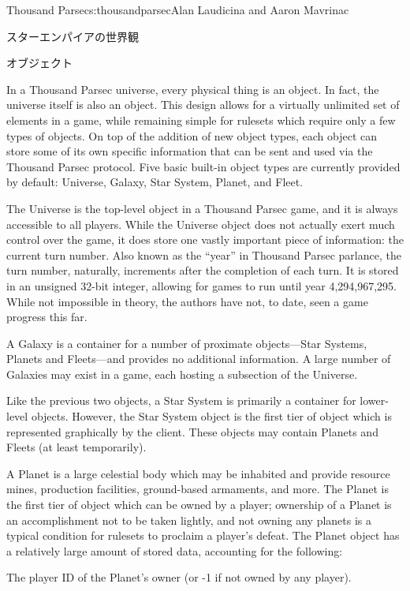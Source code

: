 \begin{aosachapter}{Thousand Parsec}{s:thousandparsec}{Alan Laudicina and Aaron Mavrinac}
\begin{aosasect1}{スターエンパイアの世界観}
\begin{aosasect2}{オブジェクト}

In a Thousand Parsec universe, every physical thing is an object. In
fact, the universe itself is also an object. This design allows for a
virtually unlimited set of elements in a game, while remaining simple
for rulesets which require only a few types of objects. On top of the
addition of new object types, each object can store some of its own
specific information that can be sent and used via the Thousand Parsec
protocol. Five basic built-in object types are currently provided by
default: Universe, Galaxy, Star System, Planet, and Fleet.

The Universe is the top-level object in a Thousand Parsec game, and it
is always accessible to all players. While the Universe object does
not actually exert much control over the game, it does store one
vastly important piece of information: the current turn number. Also
known as the ``year'' in Thousand Parsec parlance, the turn number,
naturally, increments after the completion of each turn. It is stored
in an unsigned 32-bit integer, allowing for games to run until year
4,294,967,295. While not impossible in theory, the authors have not,
to date, seen a game progress this far.

A Galaxy is a container for a number of proximate objects---Star
Systems, Planets and Fleets---and provides no additional
information. A large number of Galaxies may exist in a game, each
hosting a subsection of the Universe.

Like the previous two objects, a Star System is primarily a container
for lower-level objects. However, the Star System object is the first
tier of object which is represented graphically by the client. These
objects may contain Planets and Fleets (at least temporarily).

A Planet is a large celestial body which may be inhabited and provide
resource mines, production facilities, ground-based armaments, and
more. The Planet is the first tier of object which can be owned by a
player; ownership of a Planet is an accomplishment not to be taken
lightly, and not owning any planets is a typical condition for
rulesets to proclaim a player's defeat. The Planet object has a
relatively large amount of stored data, accounting for the following:

\begin{aosaitemize}

  \item The player ID of the Planet's owner (or -1 if not owned by any
  player).


\end{aosaitemize}
\end{aosasect2}
\end{aosasect1}
\end{aosachapter}
